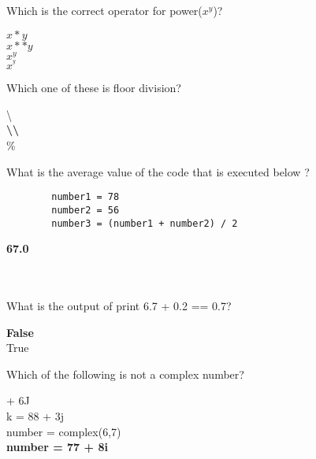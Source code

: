 \documentclass{exam}
\begin{document}
\begin{questions}
    \question Which is the correct operator for power($x^ y$)?

    \begin{oneparchoices}
        \choice $x * y$\\
        \choice \textbf{$x ** y$}\\
        \choice $x ^ y$\\
        \choice $x ^^ y$
    \end{oneparchoices}

    \question Which one of these is floor division?

    \begin{oneparchoices}
        \choice \backslash\\
        \choice \textbf{\backslash \backslash}\\
        \choice \%\\
    \end{oneparchoices}

    \question What is the average value of the code that is executed below ?

    \begin{verbatim}
        number1 = 78
        number2 = 56
        number3 = (number1 + number2) / 2
    \end{verbatim}

    \begin{oneparchoices}
        \choice \textbf{67.0}\\
        \\
        \\
    \end{oneparchoices}
    
    \quetsion What is the output of print 6.7 + 0.2 == 0.7?

    \begin{oneparchoices}
        \choice \textbf{False}\\
        \choice True
    \end{oneparchoices}

    \question Which of the following is not a complex number?

    \begin{oneparchoices}
         + 6J\\
        \choice k = 88 + 3j\\
        \choice number = complex(6,7)\\
        \choice \textbf{number = 77 + 8i} 
    \end{oneparchoices}


\end{questions}
\end{document}

